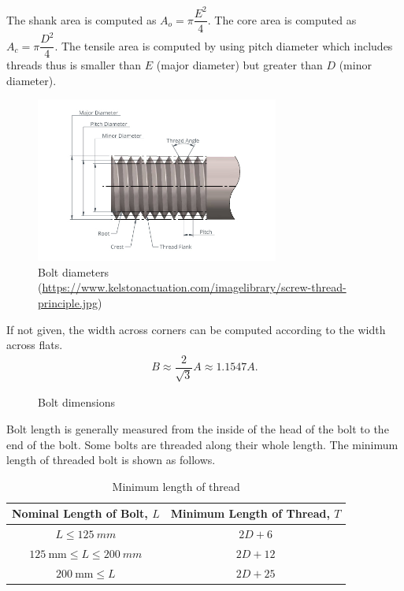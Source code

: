 The shank area is computed as $A_o=\pi\dfrac{E^2}{4}$. The core area is computed as $A_c=\pi\dfrac{D^2}{4}$. The tensile area is computed by using pitch diameter which includes threads thus is smaller than $E$ (major diameter) but greater than $D$ (minor diameter).
\begin{figure}[H]
\centering\includegraphics[width=8cm]{PIC/CH06/BDD}
\caption{Bolt diameters (\href{https://www.kelstonactuation.com/imagelibrary/screw-thread-principle.jpg}{\url{https://www.kelstonactuation.com/imagelibrary/screw-thread-principle.jpg}})}
\end{figure}

If not given, the width across corners can be computed according to the width across flats.
\begin{gather}
B\approx\dfrac{2}{\sqrt{3}}A\approx1.1547A.
\end{gather}
\begin{figure}[H]
\centering
\caption{Bolt dimensions}
\end{figure}

Bolt length is generally measured from the inside of the head of the bolt to the end of the bolt. Some bolts are threaded along their whole length. The minimum length of threaded bolt is shown as follows.
\begin{table}[H]
\centering\footnotesize\caption{Minimum length of thread}
\begin{tabular}{cc}
	\toprule
	          Nominal Length of Bolt, $L$            & Minimum Length of Thread, $T$ \\ \midrule
	            $L\leqslant\SI{125}{mm}$             &            $2D+6$             \\
	$\SI{125}{\mm}\leqslant{}L\leqslant\SI{200}{mm}$ &            $2D+12$            \\
	          $\SI{200}{\mm}\leqslant{}L$            &            $2D+25$            \\ \bottomrule
\end{tabular}
\end{table}

